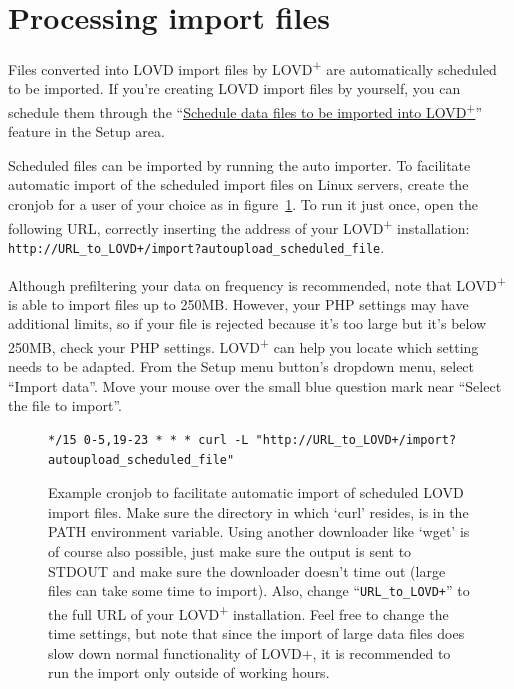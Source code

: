 \section{Processing import files}
\label{sec:import_import}
Files converted into LOVD import files by LOVD\textsuperscript{+} are automatically scheduled to be imported.
If you're creating LOVD import files by yourself, you can schedule them through the
 ``\hyperref[sec:import_monitoring]{Schedule data files to be imported into LOVD\textsuperscript{+}}''
 feature in the Setup area.

Scheduled files can be imported by running the auto importer.
To facilitate automatic import of the scheduled import files on Linux servers,
 create the cronjob for a user of your choice as in figure~\ref{fig:import_import_cronjob}.
To run it just once, open the following URL, correctly inserting the address of your LOVD\textsuperscript{+}
 installation: \texttt{http://URL\_to\_LOVD+/import?autoupload\_scheduled\_file}.

\begin{infotable}
Although prefiltering your data on frequency is recommended, note that LOVD\textsuperscript{+}
 is able to import files up to 250MB.
However, your PHP settings may have additional limits, so if your file is rejected
 because it's too large but it's below 250MB, check your PHP settings.
LOVD\textsuperscript{+} can help you locate which setting needs to be adapted.
From the Setup menu button's dropdown menu, select ``Import data''.
Move your mouse over the small blue question mark near ``Select the file to import''.
\end{infotable}

\begin{figure}[ht]
  \begin{shaded}
  \small
\begin{verbatim}
*/15 0-5,19-23 * * * curl -L "http://URL_to_LOVD+/import?autoupload_scheduled_file"
\end{verbatim}
  \caption{%
    Example cronjob to facilitate automatic import of scheduled LOVD import files.
    Make sure the directory in which `curl' resides, is in the PATH environment variable.
    Using another downloader like `wget' is of course also possible, just make sure the output is sent to STDOUT and
     make sure the downloader doesn't time out (large files can take some time to import).
    Also, change ``\texttt{URL\_to\_LOVD+}'' to the full URL of your LOVD\textsuperscript{+} installation.
    Feel free to change the time settings, but note that since the import of large data files does slow down normal
     functionality of LOVD+, it is recommended to run the import only outside of working hours.}
    \label{fig:import_import_cronjob}
  \end{shaded}
\end{figure}
\clearpage %





